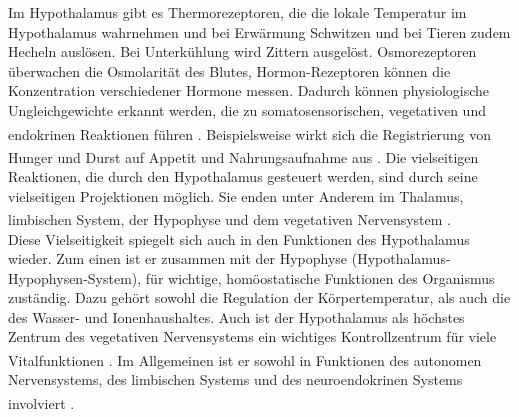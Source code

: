\documentclass[12pt,a4paper,pdftex]{article}
\begin{document}
\noindent Im Hypothalamus gibt es Thermorezeptoren, die die lokale Temperatur im Hypothalamus wahrnehmen und bei Erwärmung Schwitzen und bei Tieren zudem Hecheln auslösen. Bei Unterkühlung wird Zittern ausgelöst. Osmorezeptoren überwachen die Osmolarität des Blutes, Hormon-Rezeptoren können die Konzentration verschiedener Hormone messen. Dadurch können physiologische Ungleichgewichte erkannt werden, die zu somatosensorischen, vegetativen und endokrinen Reaktionen führen \textsuperscript{\cite[14]{penzlin2005tierphys}}. Beispielsweise wirkt sich die Registrierung von Hunger und Durst auf Appetit und Nahrungsaufnahme aus \textsuperscript{\cite[6]{storch2012lehrbuchzoo}}. Die vielseitigen Reaktionen, die durch den Hypothalamus gesteuert werden, sind durch seine vielseitigen Projektionen möglich. Sie enden unter Anderem im Thalamus, limbischen System, der Hypophyse und dem vegetativen Nervensystem \textsuperscript{\cite[16]{crossman2014neuroanatomy}}. \\

\noindent Diese Vielseitigkeit spiegelt sich auch in den Funktionen des Hypothalamus wieder. Zum einen ist er zusammen mit der Hypophyse (Hypothalamus-Hypophysen-System), für wichtige, homöostatische Funktionen des Organismus zuständig. Dazu gehört sowohl die Regulation der Körpertemperatur, als auch die des Wasser- und Ionenhaushaltes. Auch ist der Hypothalamus als höchstes Zentrum des vegetativen Nervensystems ein wichtiges Kontrollzentrum für viele Vitalfunktionen \textsuperscript{\cite[14]{penzlin2005tierphys}}. Im Allgemeinen ist er sowohl in Funktionen des autonomen Nervensystems, des limbischen Systems und des neuroendokrinen Systems involviert \textsuperscript{\cite[16]{crossman2014neuroanatomy}}.
 
\end{document}

